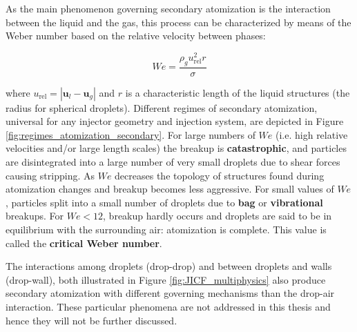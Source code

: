 \begin{itemize}
	As the main phenomenon governing secondary atomization is the interaction between the liquid and the gas, this process can be characterized by means of the Weber number based on the relative velocity between phases:
	
	\begin{equation}
	We = \frac{\rho_g u_\mathrm{rel}^2 r}{\sigma} 
	\end{equation}
	
	where $u_\mathrm{rel} = | \textbf{u}_l - \textbf{u}_g  |$ and $r$ is a characteristic length of the liquid structures (the radius for spherical droplets). Different regimes of secondary atomization, universal for any injector geometry and injection system, are depicted in Figure \ref{fig:regimes_atomization_secondary}. For large numbers of $We$ (i.e. high relative velocities and/or large length scales) the breakup is \textbf{catastrophic}, and particles are disintegrated into a large number of very small droplets due to shear forces causing stripping. As $We$ decreases the topology of structures found during atomization changes and breakup becomes less aggressive. For small values of $We$, particles split into a small number of droplets due to \textbf{bag} or \textbf{vibrational} breakups. For $We < 12$, breakup hardly occurs and droplets are said to be in equilibrium with the surrounding air: atomization is complete. This value is called the \textbf{critical Weber number}. 
	
	The interactions among droplets (drop-drop) and between droplets and walls (drop-wall), both illustrated in Figure \ref{fig:JICF_multiphysics} also produce secondary atomization with different governing mechanisms than the drop-air interaction. These particular phenomena are not addressed in this thesis and hence they will not be further discussed.
	

\end{itemize}
